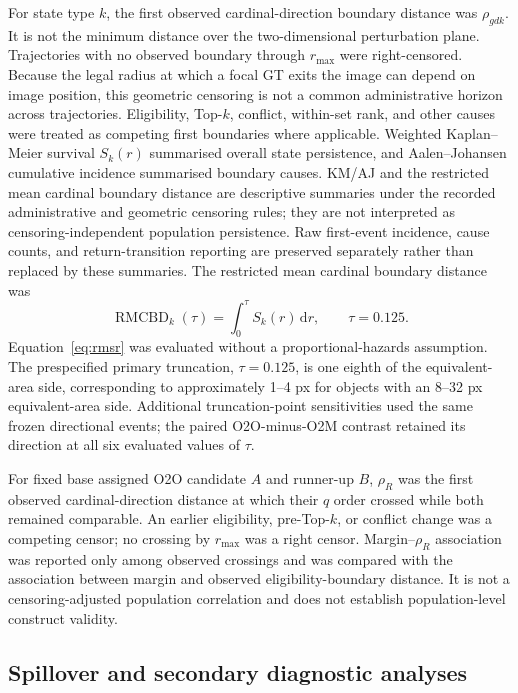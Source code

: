 For state type $k$, the first observed cardinal-direction boundary distance was $\rho_{gdk}$. It is not the minimum distance over the two-dimensional perturbation plane. Trajectories with no observed boundary through $r_{\max}$ were right-censored. Because the legal radius at which a focal GT exits the image can depend on image position, this geometric censoring is not a common administrative horizon across trajectories. Eligibility, Top-$k$, conflict, within-set rank, and other causes were treated as competing first boundaries where applicable. Weighted Kaplan--Meier survival $S_k(r)$ summarised overall state persistence, and Aalen--Johansen cumulative incidence summarised boundary causes. KM/AJ and the restricted mean cardinal boundary distance are descriptive summaries under the recorded administrative and geometric censoring rules; they are not interpreted as censoring-independent population persistence. Raw first-event incidence, cause counts, and return-transition reporting are preserved separately rather than replaced by these summaries. The restricted mean cardinal boundary distance was
\begin{equation}
\operatorname{RMCBD}_k(\tau)=\int_0^{\tau} S_k(r)\,\mathrm{d}r,
\qquad \tau=0.125.
\label{eq:rmsr}
\end{equation}
Equation~\eqref{eq:rmsr} was evaluated without a proportional-hazards assumption. The prespecified primary truncation, $\tau=0.125$, is one eighth of the equivalent-area side, corresponding to approximately 1--4 px for objects with an 8--32 px equivalent-area side. Additional truncation-point sensitivities used the same frozen directional events; the paired O2O-minus-O2M contrast retained its direction at all six evaluated values of $\tau$.

For fixed base assigned O2O candidate $A$ and runner-up $B$, $\rho_R$ was the first observed cardinal-direction distance at which their $q$ order crossed while both remained comparable. An earlier eligibility, pre-Top-$k$, or conflict change was a competing censor; no crossing by $r_{\max}$ was a right censor. Margin--$\rho_R$ association was reported only among observed crossings and was compared with the association between margin and observed eligibility-boundary distance. It is not a censoring-adjusted population correlation and does not establish population-level construct validity.

\subsection{Spillover and secondary diagnostic analyses}

